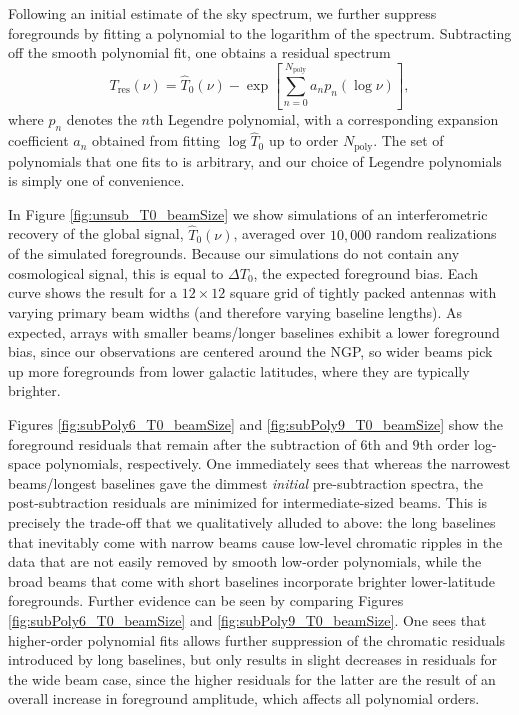 \documentclass[twolcolumn,apj,iop,numberedappendix]{emulateapj}
\begin{document}
Following an initial estimate of the sky spectrum, we further suppress foregrounds by fitting a polynomial to the logarithm of the spectrum. Subtracting off the smooth polynomial fit, one obtains a residual spectrum
\begin{equation}
\label{eq:FgFit}
T_\textrm{res} (\nu) = \widehat{T}_0(\nu) -  \exp \left[ \sum_{n=0}^{N_\textrm{poly}} a_n p_n( \log \nu) \right],
\end{equation}
where $p_n$ denotes the $n$th Legendre polynomial, with a corresponding expansion coefficient $a_n$ obtained from fitting $\log \widehat{T}_0$ up to order $N_\textrm{poly}$. The set of polynomials that one fits to is arbitrary, and our choice of Legendre polynomials is simply one of convenience.

In Figure \ref{fig:unsub_T0_beamSize} we show simulations of an interferometric recovery of the global signal, $\widehat{T}_0 (\nu)$, averaged over $10,000$ random realizations of the simulated foregrounds. Because our simulations do not contain any cosmological signal, this is equal to $\Delta T_0$, the expected foreground bias. Each curve shows the result for a $12\times12$ square grid of tightly packed antennas with varying primary beam widths (and therefore varying baseline lengths). As expected, arrays with smaller beams/longer baselines exhibit a lower foreground bias, since our observations are centered around the NGP, so wider beams pick up more foregrounds from lower galactic latitudes, where they are typically brighter.

Figures \ref{fig:subPoly6_T0_beamSize} and \ref{fig:subPoly9_T0_beamSize} show the foreground residuals that remain after the subtraction of $6$th and $9$th order log-space polynomials, respectively. One immediately sees that whereas the narrowest beams/longest baselines gave the dimmest \emph{initial} pre-subtraction spectra, the post-subtraction residuals are minimized for intermediate-sized beams. This is precisely the trade-off that we qualitatively alluded to above: the long baselines that inevitably come with narrow beams cause low-level chromatic ripples in the data that are not easily removed by smooth low-order polynomials, while the broad beams that come with short baselines incorporate brighter lower-latitude foregrounds. Further evidence can be seen by comparing Figures \ref{fig:subPoly6_T0_beamSize} and \ref{fig:subPoly9_T0_beamSize}. One sees that higher-order polynomial fits allows further suppression of the chromatic residuals introduced by long baselines, but only results in slight decreases in residuals for the wide beam case, since the higher residuals for the latter are the result of an overall increase in foreground amplitude, which affects all polynomial orders.
\end{document}
